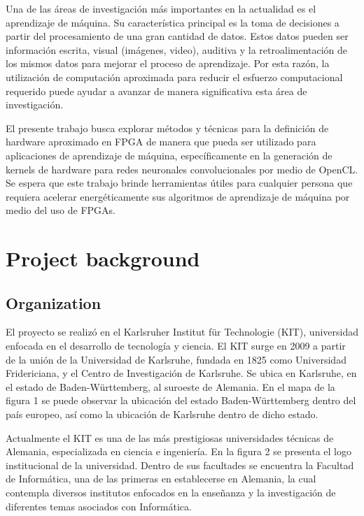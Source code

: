 Una de las áreas de investigación más importantes en la actualidad es el aprendizaje de máquina. Su
característica principal es la toma de decisiones a partir del procesamiento de una gran cantidad de
datos. Estos datos pueden ser información escrita, visual (imágenes, video), auditiva y la
retroalimentación de los mismos datos para mejorar el proceso de aprendizaje. Por esta razón, la
utilización de computación aproximada para reducir el esfuerzo computacional requerido puede ayudar
a avanzar de manera significativa esta área de investigación.

El presente trabajo busca explorar métodos y técnicas para la definición de hardware aproximado en FPGA 
de manera que pueda ser utilizado para aplicaciones de aprendizaje de máquina, específicamente en la 
generación de kernels de hardware para redes neuronales convolucionales por medio de OpenCL. Se espera
que este trabajo brinde herramientas útiles para cualquier persona que requiera acelerar
energéticamente sus algoritmos de aprendizaje de máquina por medio del uso de FPGAs.

\section{Project background}

\subsection{Organization}

El proyecto se realizó en el Karlsruher Institut für Technologie (KIT), universidad enfocada en el
desarrollo de tecnología y ciencia. El KIT surge en 2009 a partir de la unión de la Universidad de
Karlsruhe, fundada en 1825 como Universidad Fridericiana, y el Centro de Investigación de Karlsruhe. Se
ubica en Karlsruhe, en el estado de Baden-Württemberg, al suroeste de Alemania. En el mapa de la
figura 1 se puede observar la ubicación del estado Baden-Württemberg dentro del país europeo, así
como la ubicación de Karlsruhe dentro de dicho estado.

Actualmente el KIT es una de las más prestigiosas universidades técnicas de Alemania, especializada en
ciencia e ingeniería. En la figura 2 se presenta el logo institucional de la universidad. Dentro de sus
facultades se encuentra la Facultad de Informática, una de las primeras en establecerse en Alemania, la
cual contempla diversos institutos enfocados en la enseñanza y la investigación de diferentes temas
asociados con Informática.

